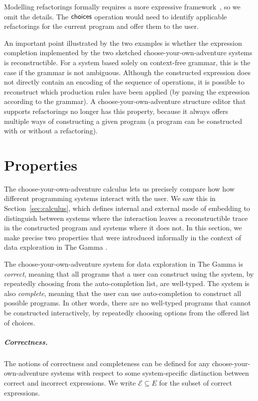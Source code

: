 \documentclass[a4paper,UKenglish,cleveref, autoref, thm-restate]{lipics-v2021}
\newcommand{\ident}[1]{\textsf{#1}}
\newcommand{\choices}{\textnormal{\ident{choices}}}
\begin{document}
Modelling refactorings formally requires a more expressive framework~\cite{steimann-2011-refactoring},
so we omit the details. The $\choices$ operation would need to identify applicable refactorings
for the current program and offer them to the user.

An important point illustrated by the two examples is whether the expression completion
implemented by the two sketched choose-your-own-adventure systems is reconstructible.
For a system based solely on context-free grammar, this is the case if the grammar is not
ambiguous. Although the constructed expression does not directly contain an encoding of the
sequence of operations, it is possible to reconstruct which production rules have been applied
(by parsing the expression according to the grammar). A choose-your-own-adventure structure
editor that supports refactorings no longer has this property, because it always offers multiple
ways of constructing a given program (a program can be constructed with or without a refactoring).

\newpage

\section{Properties}
\label{sec:properties}

The choose-your-own-adventure calculus lets us precisely compare how how different
programming systems interact with the user. We saw this in Section~\ref{sec:calculus}, which
defines internal and external mode of embedding to distinguish between systems where the
interaction leaves a reconstructible trace in the constructed program and systems where it does not.
In this section, we make precise two properties that were introduced informally in the context of
data exploration in The Gamma \cite{petricek-2022-thegamma}.

The choose-your-own-adventure system for data exploration in The Gamma is \emph{correct}, meaning that
all programs that a user can construct using the system, by repeatedly choosing from the
auto-completion list, are well-typed. The system is also \emph{complete}, meaning that the user can
use auto-completion to construct all possible programs. In other words, there are no well-typed programs
that cannot be constructed interactively, by repeatedly choosing options from the offered list of
choices.

\subparagraph{Correctness.}
The notions of correctness and completeness can be defined for any
choose-your-own-adventure systems with respect to some system-specific distinction between
correct and incorrect expressions. We write $\mathcal{E} \subseteq E$ for the subset
of correct expressions.
\end{document}
